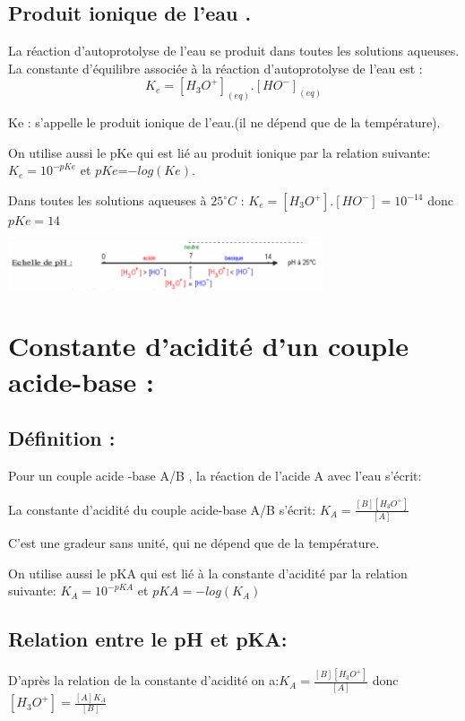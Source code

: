 \documentclass[12pt]{article}
\begin{document}
\subsection{Produit ionique de l'eau . }
La réaction d'autoprotolyse de l'eau se produit dans toutes les solutions aqueuses.
La constante d'équilibre associée à la réaction d'autoprotolyse de l'eau est :$$K_e = [H_3O^+]_{(eq)}.[HO^-]_{(eq)}$$

Ke : s'appelle le produit ionique de l'eau.(il ne dépend que de la température).

On utilise aussi le pKe qui est lié au produit ionique par la relation suivante:
$K_e = 10^{-pKe}$ et $pKe$=$-log(Ke)$.


Dans toutes les solutions aqueuses à $25^{\circ}C$ : $K_e = [H_3O^+].[HO^-]=10^{-14}$ donc $pKe = 14$

\begin{center}
	\includegraphics[width=0.7\textwidth]{./img/echellePH.png}
\end{center}

\section{Constante d'acidité d'un couple acide-base : }

\subsection{Définition : }
Pour un couple acide -base A/B , la réaction de l'acide A avec l'eau s'écrit: 

La constante d'acidité du couple acide-base A/B s'écrit: $K_A = \frac{[B][H_3O^+]}{[A]}$

C'est une gradeur sans unité, qui ne dépend que de la température.

On utilise aussi le pKA qui est lié à la constante d'acidité par la relation suivante:
$K_A =  10^{-pKA}$ et $pKA = -log(K_A)$

\subsection{Relation entre le pH et pKA: }
D'après la relation de la constante d'acidité on a:$K_A = \frac{[B][H_3O^+]}{[A]}$ donc $[H_3O^+] = \frac{[A]K_A}{[B]} $
\end{document}
